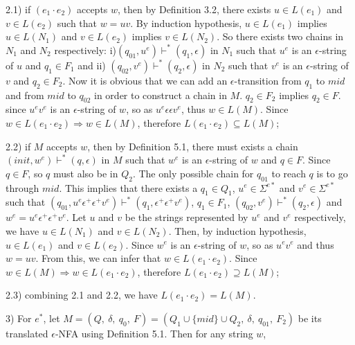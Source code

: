 \documentclass[twoside,openright,final]{bhamthesis}
\begin{document}
\par 2.1) if \((e_1 \cdot e_2)\) accepts \(w\), then by Definition
3.2, there exists \(u \in L(e_1)\) and \(v \in L(e_2)\) such that \(w
= uv\). By induction hypothesis, \(u \in L(e_1)\) implies \(u \in
L(N_1)\) and \(v \in L(e_2)\) implies \(v \in L(N_2)\). So there
exists two chains in \(N_1\) and \(N_2\) respectively: i)\((q_{01} ,
u^e) \vdash^* (q_1 , \epsilon)\) in \(N_1\) such that
\(u^e\) is an \(\epsilon\)-string of \(u\) and \(q_1 \in F_1\) and
ii) \((q_{02} , v^e) \vdash^* (q_2 , \epsilon)\) in \(N_2\)
such that \(v^e\) is an \(\epsilon\)-string of \(v\) and \(q_2 \in
F_2\). Now it is obvious
that we can add an \(\epsilon\)-transition from \(q_1\) to \(mid\) and
from \(mid\) to \(q_{02}\) in order to construct a chain in \(M\). \(q_2
\in F_2\) implies \(q_2 \in F\). since \(u^ev^e\) is an
\(\epsilon\)-string of \(w\), so as \(u^e\epsilon \epsilon
v^e\), thus \(w \in L(M)\). Since \(w \in
L(e_1 \cdot e_2) \Rightarrow w \in L(M)\), therefore \(L(e_1 \cdot
e_2) \subseteq L(M)\);

\par 2.2) if \(M\) accepts \(w\), then by Definition 5.1, there must exists
a chain \((init , w^e) \vdash^* (q , \epsilon)\) in \(M\) such that
\(w^e\) is an \(\epsilon\)-string of \(w\) and \(q \in F\). Since \(q
\in F\), so \(q\) must also be in \(Q_2\). The only possible chain for
\(q_{01}\) to reach \(q\) is to go through \(mid\). This implies that
there exists a \(q_1 \in Q_1\), \(u^e \in \Sigma^{e*}\) and \(v^e \in
\Sigma^{e*}\) such that \((q_{01} , u^e\epsilon^+ \epsilon^+ v^e) \vdash^*
(q_1 , \epsilon^+ \epsilon^+ v^e)\), \(q_1 \in F_1\), \((q_{02} , v^e)
\vdash^* (q_2 , \epsilon)\) and \(w^e = u^e\epsilon^+ \epsilon^+
v^e\). Let \(u\) and \(v\) be the strings represented by \(u^e\) and
\(v^e\) respectively, we have \(u \in L(N_1)\) and \(v \in
L(N_2)\). Then, by induction hypothesis, \(u \in L(e_1)\) and \(v \in
L(e_2)\). Since \(w^e\) is an \(\epsilon\)-string of \(w\), so as
\(u^ev^e\) and thus \(w =
uv\). From this, we can infer that \(w \in L(e_1 \cdot e_2)\). Since
\(w \in L(M) \Rightarrow w \in L(e_1 \cdot e_2)\), therefore \(L(e_1 \cdot
e_2) \supseteq L(M)\);

\par 2.3) combining 2.1 and 2.2, we have \(L(e_1 \cdot e_2) = L(M)\). 

\par 3) For \(e^*\), let \(M = (Q,\ \delta,\ q_0,\ F) = (Q_1 \cup \{mid\} \cup Q_2,\ \delta,\ q_{01},\ F_2)\) be its
translated \(\epsilon\)-NFA using Definition 5.1. Then for any string
\(w\), 
\end{document}
